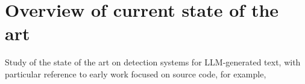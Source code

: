 \clearpage

\chapter{Overview of current state of the art}
Study of the state of the art on detection systems for LLM-generated text, with particular reference to early work focused on source code, for example,